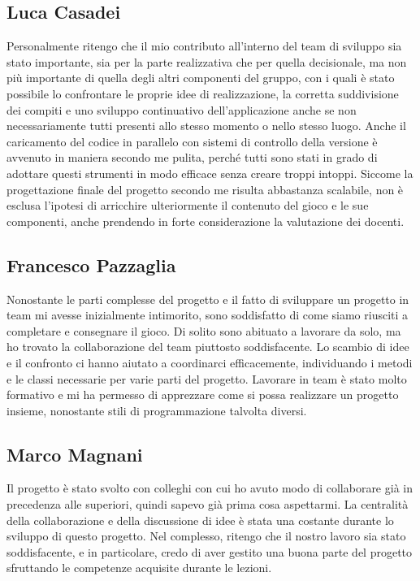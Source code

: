 \documentclass[a4paper,12pt]{report}
\begin{document}
\subsection{Luca Casadei}
Personalmente ritengo che il mio contributo all'interno del team di sviluppo sia stato importante, sia per la parte realizzativa che per quella decisionale, ma non più importante di quella degli altri componenti del gruppo, con i quali è stato possibile lo confrontare le proprie idee di realizzazione, la corretta suddivisione dei compiti e uno sviluppo continuativo dell'applicazione anche se non necessariamente tutti presenti allo stesso momento o nello stesso luogo. Anche il caricamento del codice in parallelo con sistemi di controllo della versione è avvenuto in maniera secondo me pulita, perché tutti sono stati in grado di adottare questi strumenti in modo efficace senza creare troppi intoppi. Siccome la progettazione finale del progetto secondo me risulta abbastanza scalabile, non è esclusa l'ipotesi di arricchire ulteriormente il contenuto del gioco e le sue componenti, anche prendendo in forte considerazione la valutazione dei docenti.

\subsection{Francesco Pazzaglia}

Nonostante le parti complesse del progetto e il fatto di sviluppare un progetto in team mi avesse inizialmente intimorito, sono soddisfatto di come siamo riusciti a completare e consegnare il gioco. Di solito sono abituato a lavorare da solo, ma ho trovato la collaborazione del team piuttosto soddisfacente. Lo scambio di idee e il confronto ci hanno aiutato a coordinarci efficacemente, individuando i metodi e le classi necessarie per varie parti del progetto. Lavorare in team è stato molto formativo e mi ha permesso di apprezzare come si possa realizzare un progetto insieme, nonostante stili di programmazione talvolta diversi.

\subsection{Marco Magnani}
Il progetto è stato svolto con colleghi con cui ho avuto modo di collaborare già in precedenza alle superiori, quindi sapevo già prima cosa aspettarmi. La centralità della collaborazione e della discussione di idee è stata una costante durante lo sviluppo di questo progetto. Nel complesso, ritengo che il nostro lavoro sia stato soddisfacente, e in particolare, credo di aver gestito una buona parte del progetto sfruttando le competenze acquisite durante le lezioni.
\end{document}

